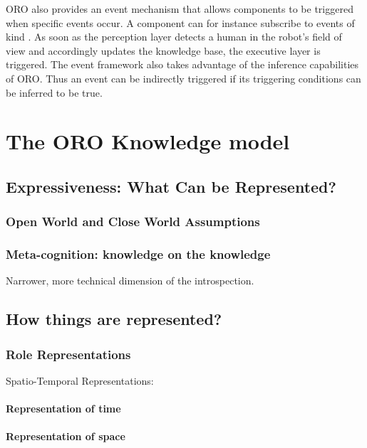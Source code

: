ORO also provides an event mechanism that allows components to be triggered
when specific events occur. A component can for instance subscribe to events
of kind . As soon as the
perception layer detects a human in the robot's field of view and accordingly
updates the knowledge base, the executive layer is triggered. The event
framework also takes advantage of the inference capabilities of ORO. Thus an
event can be indirectly triggered if its triggering conditions can be
inferred to be true.



\section{The ORO Knowledge model}
\label{sect|knowledge-model}

\subsection{Expressiveness: What Can be Represented?}
\subsubsection{Open World and Close World Assumptions}
\subsubsection{Meta-cognition: knowledge on the knowledge}
Narrower, more technical dimension of the introspection.

\subsection{How things are represented?}
\subsubsection{Role Representations}
Spatio-Temporal Representations:

\paragraph{Representation of time}
\paragraph{Representation of space}
